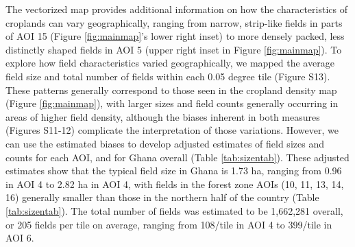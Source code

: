 \documentclass[11pt,a4paper]{article}
\begin{document}
The vectorized map provides additional information on how the
characteristics of croplands can vary geographically, ranging from
narrow, strip-like fields in parts of AOI 15 (Figure \ref{fig:mainmap}'s
lower right inset) to more densely packed, less distinctly shaped fields
in AOI 5 (upper right inset in Figure \ref{fig:mainmap}). To explore how
field characteristics varied geographically, we mapped the average field
size and total number of fields within each 0.05 degree tile (Figure
S13). These patterns generally correspond to those seen in the cropland
density map (Figure \ref{fig:mainmap}), with larger sizes and field
counts generally occurring in areas of higher field density, although
the biases inherent in both measures (Figures S11-12) complicate the
interpretation of those variations. However, we can use the estimated
biases to develop adjusted estimates of field sizes and counts for each
AOI, and for Ghana overall (Table \ref{tab:sizentab}). These adjusted
estimates show that the typical field size in Ghana is 1.73 ha, ranging
from 0.96 in AOI 4 to 2.82 ha in AOI 4, with fields in the forest zone
AOIs (10, 11, 13, 14, 16) generally smaller than those in the northern
half of the country (Table \ref{tab:sizentab}). The total number of
fields was estimated to be 1,662,281 overall, or 205 fields per tile on
average, ranging from 108/tile in AOI 4 to 399/tile in AOI 6.
\end{document}
